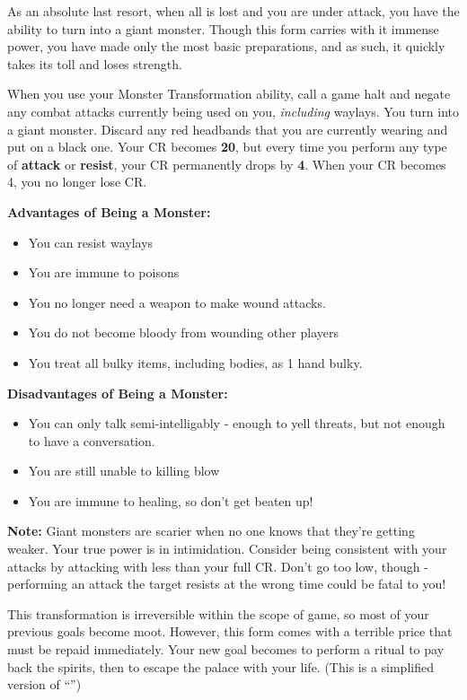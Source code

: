 \documentclass[green]{NeptuneBall}
\begin{document}
\name{\gMonsterTransformation{}}

As an absolute last resort, when all is lost and you are under attack, you have the ability to turn into a giant monster. Though this form carries with it immense power, you have made only the most basic preparations, and as such, it quickly takes its toll and loses strength.

When you use your Monster Transformation ability, call a game halt and negate any combat attacks currently being used on you, \emph{including} waylays. You turn into a giant monster. Discard any red headbands that you are currently wearing and put on a black one. Your CR becomes {\bf 20}, but every time you perform any type of {\bf attack} or {\bf resist}, your CR permanently drops by {\bf 4}. When your CR becomes 4, you no longer lose CR.

{\bf Advantages of Being a Monster:}
\begin{itemize}
\item You can resist waylays
\item You are immune to poisons
\item You no longer need a weapon to make wound attacks.
\item You do not become bloody from wounding other players
\item You treat all bulky items, including bodies, as 1 hand bulky.
\end{itemize}

{\bf Disadvantages of Being a Monster:}
\begin{itemize}
\item You can only talk semi-intelligably - enough to yell threats, but not enough to have a conversation.
\item You are still unable to killing blow
\item You are immune to healing, so don't get beaten up!
\end{itemize}

{\bf Note:} Giant monsters are scarier when no one knows that they're getting weaker. Your true power is in intimidation. Consider being consistent with your attacks by attacking with less than your full CR. Don't go too low, though - performing an attack the target resists at the wrong time could be fatal to you! 

This transformation is irreversible within the scope of game, so most of your previous goals become moot. However, this form comes with a terrible price that must be repaid immediately. Your new goal becomes to perform a ritual to pay back the spirits, then to escape the palace with your life. (This is a simplified version of ``\gRitual{}'')
\end{document}
